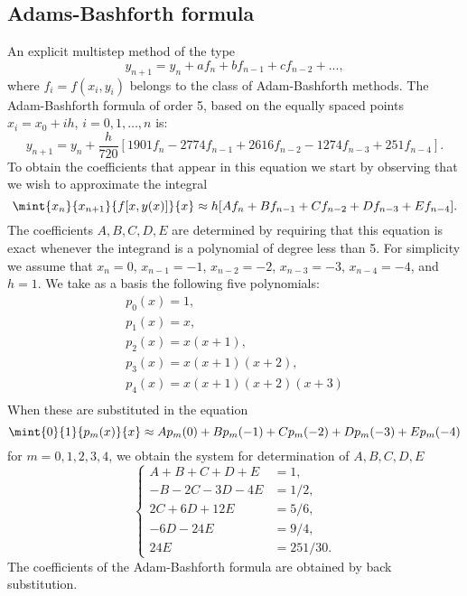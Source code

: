 \subsection{Adams-Bashforth formula}

An explicit multistep method of the type
%
\begin{equation}
  y_{n+1} = y_n + a f_n + b f_{n-1} + c f_{n-2} +...,\label{adams}
\end{equation}
%
where $f_i=f(x_i,y_i)$ belongs to the class of Adam-Bashforth methods.
The Adam-Bashforth formula of order 5, based on the equally spaced
points $x_i = x_0 + i h$, $i=0,1,\ldots,n$ is:
%
\begin{equation}
  y_{n+1} = y_n + \frac{h}{720} [ 1901 f_n - 2774 f_{n-1} +
  2616 f_{n-2} - 1274 f_{n-3} + 251 f_{n-4}].\label{pred}
\end{equation}
%
To obtain the coefficients that appear in this equation we start by
observing that we wish to approximate the integral
%
\begin{equation}
  \mint{x_n}{x_{n+1}}{f[x,y(x)]}{x} \approx h [A f_n + B f_{n-1} +
  C f_{n-2} + D f_{n-3} + E f_{n-4}].
  \label{IVP.eq:26}
\end{equation}
The coefficients $A,B,C,D,E$ are determined by requiring that this
equation is exact whenever the integrand is a polynomial of degree
less than 5. For simplicity we assume that $x_n=0$, $x_{n-1}=-1$,
$x_{n-2}=-2$, $x_{n-3}=-3$, $x_{n-4}=-4$, and $h=1$. We take as a
basis the following five polynomials:
%
\begin{equation}
  \begin{array}{l}
    p_0(x)=1, \\ p_1(x)=x, \\
    p_2(x)=x(x+1), \\ p_3(x)=x(x+1)(x+2), \\
    p_4(x)=x(x+1)(x+2)(x+3) \\  
  \end{array}
  \label{IVP.eq:27}
\end{equation}
%
When these are substituted in the equation 
%
\begin{equation}
  \mint{0}{1}{p_m(x)}{x} \approx A p_m(0)+B p_m(-1)+C p_m(-2)+D p_m(-3)+E p_m(-4)
  \label{IVP.eq:28}
\end{equation}
%
for $m=0,1,2,3,4$, we obtain the system for determination of
$A,B,C,D,E$
% 
\begin{equation}
  \left\{
    \begin{aligned}
      A + B + C + D + E & = 1,\\
      -B - 2C - 3D - 4E & = 1/2,\\
      2C + 6D + 12E     & = 5/6,\\
      -6D - 24E         & = 9/4,\\
      24E                & = 251/30.
    \end{aligned} \right .
  \label{IVP.eq:29}
\end{equation}
%
The coefficients of the Adam-Bashforth formula are obtained by back
substitution.

